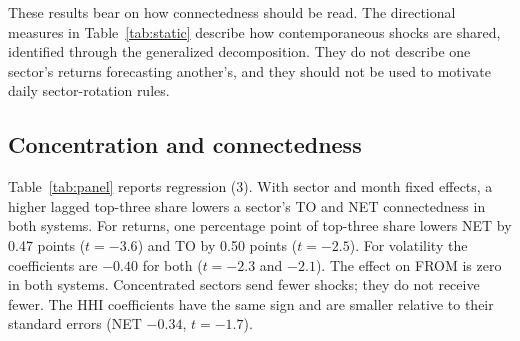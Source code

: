 \documentclass[11pt]{article}
\begin{document}
These results bear on how connectedness should be read. The directional measures in Table~\ref{tab:static} describe how contemporaneous shocks are shared, identified through the generalized decomposition. They do not describe one sector's returns forecasting another's, and they should not be used to motivate daily sector-rotation rules.

\subsection{Concentration and connectedness}\label{sec:conc}

Table~\ref{tab:panel} reports regression (3). With sector and month fixed effects, a higher lagged top-three share lowers a sector's TO and NET connectedness in both systems. For returns, one percentage point of top-three share lowers NET by 0.47 points ($t=-3.6$) and TO by 0.50 points ($t=-2.5$). For volatility the coefficients are $-0.40$ for both ($t=-2.3$ and $-2.1$). The effect on FROM is zero in both systems. Concentrated sectors send fewer shocks; they do not receive fewer. The HHI coefficients have the same sign and are smaller relative to their standard errors (NET $-0.34$, $t=-1.7$).
\end{document}
